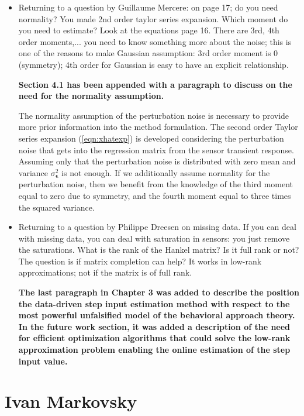 \documentclass[11pt]{article}
\begin{document}
\begin{itemize}
	\item Returning to a question by Guillaume Mercere: on page 17; do you need normality? You made 2nd order taylor series expansion. Which moment do you need to estimate? Look at the equations page 16. There are 3rd, 4th order moments,... you need to know something more about the noise; this is one of the reasons to make Gaussian assumption: 3rd order moment is 0 (symmetry); 4th order for Gaussian is easy to have an explicit relationship.
	
    {\bfseries Section 4.1 has been appended with a paragraph to discuss on the need for the normality assumption.  }

    \color{blue}
    The normality assumption of the perturbation noise is necessary to provide more prior information into the method formulation.
    The second order Taylor series expansion (\ref{eqn:xhatexp}) is developed considering the perturbation noise that gets into the regression matrix from the sensor transient response.
    Assuming only that the perturbation noise is distributed with zero mean and variance $\sigma_{\bm{\epsilon}}^2$ is not enough.
    If we additionally assume normality for the perturbation noise, then we benefit from the knowledge of the third moment equal to zero due to symmetry, and the fourth moment equal to three times the squared variance.
    \color{black}

	\item  Returning to a question by Philippe Dreesen on missing data. If you can deal with missing data, you can deal with saturation in sensors: you just remove the saturations. What is the rank of the Hankel matrix? Is it full rank or not? The question is if matrix completion can help? It works in low-rank approximations; not if the matrix is of full rank.
	
	{\bfseries The last paragraph in Chapter 3 was added to describe the position the data-driven step input estimation method with respect to the most powerful unfalsified model of the behavioral approach theory. In the future work section, it was added a description of the need for efficient optimization algorithms that could solve the low-rank approximation problem enabling the online estimation of the step input value. }
\end{itemize}

\section*{Ivan Markovsky}
\end{document}
